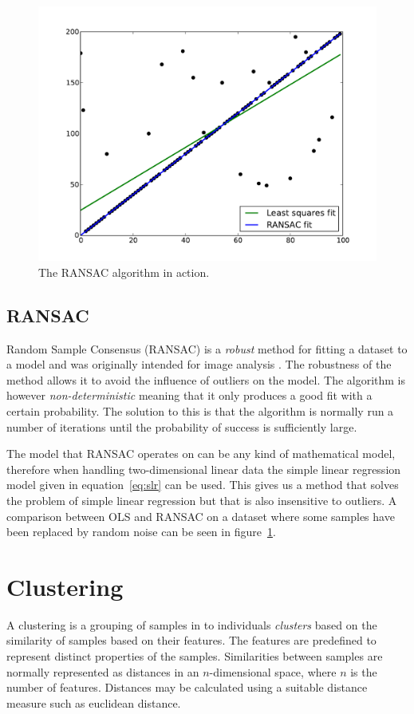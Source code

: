 \documentclass[a4paper]{report}
\begin{document}
\begin{figure}[t]
    \includegraphics[width=\linewidth]{ransac}
    \caption{The RANSAC algorithm in action.}
    \label{fig:ransac}
\end{figure}

\subsection{RANSAC}
Random Sample Consensus (RANSAC) is a \emph{robust} method for fitting a
dataset to a model and was originally intended for image analysis
\cite{fischler81}. The robustness of the method allows it to avoid the
influence of outliers on the model. The algorithm is however
\emph{non-deterministic} meaning that it only produces a good fit with a
certain probability. The solution to this is that the algorithm is normally
run a number of iterations until the probability of success is sufficiently
large.

The model that RANSAC operates on can be any kind of mathematical model, 
therefore when handling two-dimensional linear data the simple linear
regression model given in equation~\ref{eq:slr} can be used. This gives us a
method that solves the problem of simple linear regression but that is also
insensitive to outliers. A comparison between OLS and RANSAC on a dataset where
some samples have been replaced by random noise can be seen in
figure~\ref{fig:ransac}.

\section{Clustering}
A clustering is a grouping of samples in to individuals \textit{clusters}
based on the similarity of samples based on their features. The features are
predefined to represent distinct properties of the samples. Similarities
between samples are normally represented as distances in an $n$-dimensional
space, where $n$ is the number of features. Distances may be calculated using
a suitable distance measure such as euclidean distance. 
\end{document}
